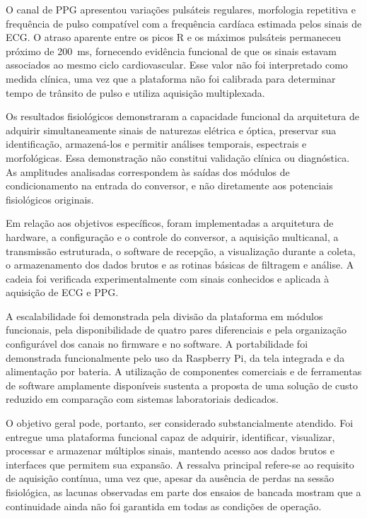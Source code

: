 \documentclass[a4paper,12pt]{fcte}
\begin{document}
O canal de PPG apresentou variações pulsáteis regulares, morfologia repetitiva e frequência de pulso compatível com a frequência cardíaca estimada pelos sinais de ECG. O atraso aparente entre os picos R e os máximos pulsáteis permaneceu próximo de 200~ms, fornecendo evidência funcional de que os sinais estavam associados ao mesmo ciclo cardiovascular. Esse valor não foi interpretado como medida clínica, uma vez que a plataforma não foi calibrada para determinar tempo de trânsito de pulso e utiliza aquisição multiplexada.

Os resultados fisiológicos demonstraram a capacidade funcional da arquitetura de adquirir simultaneamente sinais de naturezas elétrica e óptica, preservar sua identificação, armazená-los e permitir análises temporais, espectrais e morfológicas. Essa demonstração não constitui validação clínica ou diagnóstica. As amplitudes analisadas correspondem às saídas dos módulos de condicionamento na entrada do conversor, e não diretamente aos potenciais fisiológicos originais.

Em relação aos objetivos específicos, foram implementadas a arquitetura de hardware, a configuração e o controle do conversor, a aquisição multicanal, a transmissão estruturada, o software de recepção, a visualização durante a coleta, o armazenamento dos dados brutos e as rotinas básicas de filtragem e análise. A cadeia foi verificada experimentalmente com sinais conhecidos e aplicada à aquisição de ECG e PPG.

A escalabilidade foi demonstrada pela divisão da plataforma em módulos funcionais, pela disponibilidade de quatro pares diferenciais e pela organização configurável dos canais no firmware e no software. A portabilidade foi demonstrada funcionalmente pelo uso da Raspberry Pi, da tela integrada e da alimentação por bateria. A utilização de componentes comerciais e de ferramentas de software amplamente disponíveis sustenta a proposta de uma solução de custo reduzido em comparação com sistemas laboratoriais dedicados.

O objetivo geral pode, portanto, ser considerado substancialmente atendido. Foi entregue uma plataforma funcional capaz de adquirir, identificar, visualizar, processar e armazenar múltiplos sinais, mantendo acesso aos dados brutos e interfaces que permitem sua expansão. A ressalva principal refere-se ao requisito de aquisição contínua, uma vez que, apesar da ausência de perdas na sessão fisiológica, as lacunas observadas em parte dos ensaios de bancada mostram que a continuidade ainda não foi garantida em todas as condições de operação.
\end{document}
